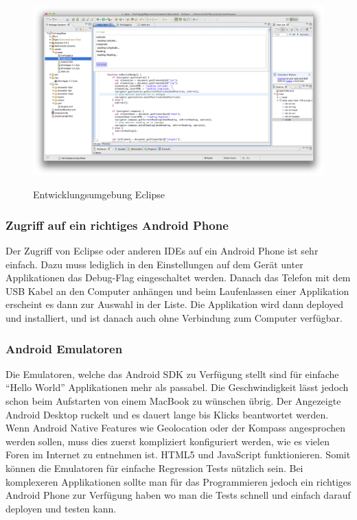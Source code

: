 \begin{figure}[H]
	\centering			      
        \includegraphics[width=14cm]{images/eclipse-shot.png}\\
		\caption{Entwicklungsumgebung Eclipse}
	\label{fig:eclipse-project}
\end{figure}

\subsubsection{Zugriff auf ein richtiges Android Phone} %
\label{ssub:Zugriff auf ein richtiges Android Phone}
Der Zugriff von Eclipse oder anderen IDEs auf ein Android Phone ist sehr einfach. Dazu muss lediglich in den Einstellungen auf dem Gerät unter Applikationen das Debug-Flag eingeschaltet werden. Danach das Telefon mit dem USB Kabel an den Computer anhängen und beim Laufenlassen einer Applikation erscheint es dann zur Auswahl in der Liste. Die Applikation wird dann deployed und installiert, und ist danach auch ohne Verbindung zum Computer verfügbar.

\subsubsection{Android Emulatoren} %
\label{ssub:Android Emulatoren}
Die Emulatoren, welche das Android SDK zu Verfügung stellt sind für einfache "`Hello World"' Applikationen mehr als passabel. Die Geschwindigkeit lässt jedoch schon beim Aufstarten von einem MacBook zu wünschen übrig. Der Angezeigte Android Desktop ruckelt und es dauert lange bis Klicks beantwortet werden. Wenn Android Native Features wie Geolocation oder der Kompass angesprochen werden sollen, muss dies zuerst kompliziert konfiguriert werden, wie es vielen Foren im Internet zu entnehmen ist. HTML5 und JavaScript funktionieren. Somit können die Emulatoren für einfache Regression Tests nützlich sein. Bei komplexeren Applikationen sollte man für das Programmieren jedoch ein richtiges Android Phone zur Verfügung haben wo man die Tests schnell und einfach darauf deployen und testen kann.

